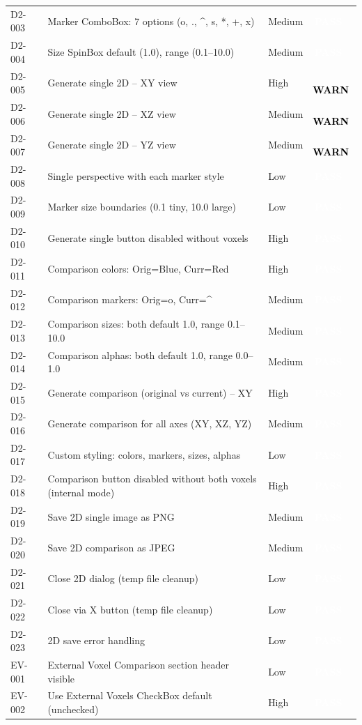 \documentclass[12pt,a4paper]{article}
\newcommand{\statuspass}{\colorbox{statusgreen}{\textcolor{white}{\textbf{\,PASS\,}}}}
\newcommand{\statuswarn}{\colorbox{statusyellow}{\textcolor{black}{\textbf{\,WARN\,}}}}
\begin{document}
{\begin{longtable}{p{1.7cm}p{7.7cm}p{1.3cm}p{2cm}}
D2-003 & Marker ComboBox: 7 options (o, ., \textasciicircum, s, *, +, x) & Medium & \statuspass \\
D2-004 & Size SpinBox default (1.0), range (0.1--10.0) & Medium & \statuspass \\
D2-005 & Generate single 2D -- XY view & High & \statuswarn \\
D2-006 & Generate single 2D -- XZ view & Medium & \statuswarn \\
D2-007 & Generate single 2D -- YZ view & Medium & \statuswarn \\
D2-008 & Single perspective with each marker style & Low & \statuspass \\
D2-009 & Marker size boundaries (0.1 tiny, 10.0 large) & Low & \statuspass \\
D2-010 & Generate single button disabled without voxels & High & \statuspass \\
D2-011 & Comparison colors: Orig=Blue, Curr=Red & High & \statuspass \\
D2-012 & Comparison markers: Orig=o, Curr=\textasciicircum & Medium & \statuspass \\
D2-013 & Comparison sizes: both default 1.0, range 0.1--10.0 & Medium & \statuspass \\
D2-014 & Comparison alphas: both default 1.0, range 0.0--1.0 & Medium & \statuspass \\
D2-015 & Generate comparison (original vs current) -- XY & High & \statuspass \\
D2-016 & Generate comparison for all axes (XY, XZ, YZ) & Medium & \statuspass \\
D2-017 & Custom styling: colors, markers, sizes, alphas & Low & \statuspass \\
D2-018 & Comparison button disabled without both voxels (internal mode) & High & \statuspass \\
D2-019 & Save 2D single image as PNG & Medium & \statuspass \\
D2-020 & Save 2D comparison as JPEG & Medium & \statuspass \\
D2-021 & Close 2D dialog (temp file cleanup) & Low & \statuspass \\
D2-022 & Close via X button (temp file cleanup) & Low & \statuspass \\
D2-023 & 2D save error handling & Low & \statuspass \\
EV-001 & External Voxel Comparison section header visible & Low & \statuspass \\
EV-002 & Use External Voxels CheckBox default (unchecked) & High & \statuspass \\

\end{longtable}}
\end{document}
